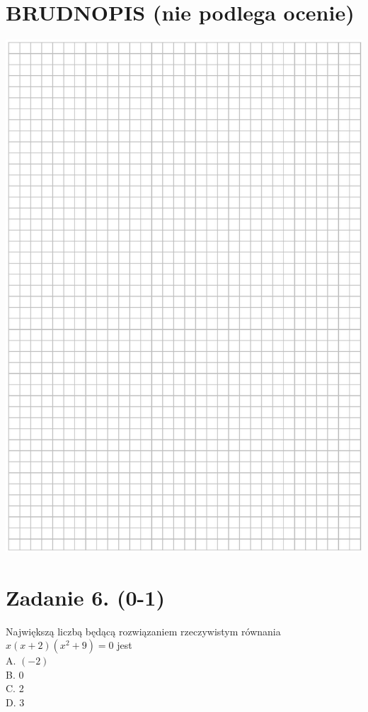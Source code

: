 \documentclass[10pt]{article}
\begin{document}
\section*{BRUDNOPIS (nie podlega ocenie)}
\begin{center}
\includegraphics[max width=\textwidth]{2024_11_21_0a35d272448d5080a489g-05}
\end{center}

\section*{Zadanie 6. (0-1)}
Największą liczbą będącą rozwiązaniem rzeczywistym równania \(x(x+2)\left(x^{2}+9\right)=0\) jest\\
A. \((-2)\)\\
B. 0\\
C. 2\\
D. 3
\end{document}
